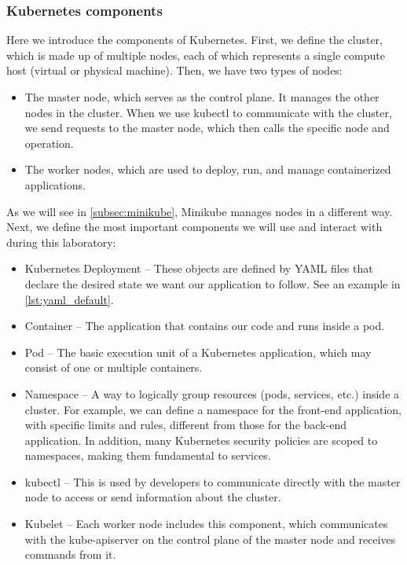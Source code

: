 \subsubsection{Kubernetes components}
\label{subsubsec:kubernetes components}
Here we introduce the components of Kubernetes. First, we define the cluster, which is made up of multiple nodes, each of which represents a single compute host (virtual or physical machine). Then, we have two types of nodes:

\begin{itemize}
    \item The master node, which serves as the control plane. It manages the other nodes in the cluster. When we use kubectl to communicate with the cluster, we send requests to the master node, which then calls the specific node and operation.
    \item The worker nodes, which are used to deploy, run, and manage containerized applications.
\end{itemize}
As we will see in \autoref{subsec:minikube}, Minikube manages nodes in a different way.
Next, we define the most important components we will use and interact with during this laboratory:

\begin{itemize}
    \item Kubernetes Deployment – These objects are defined by YAML files that declare the desired state we want our application to follow. See an example in \autoref{lst:yaml_default}.
    \item Container – The application that contains our code and runs inside a pod.
    \item Pod – The basic execution unit of a Kubernetes application, which may consist of one or multiple containers.
    \item Namespace – A way to logically group resources (pods, services, etc.) inside a cluster. For example, we can define a namespace for the front-end application, with specific limits and rules, different from those for the back-end application. In addition, many Kubernetes security policies are scoped to namespaces, making them fundamental to services.
    \item kubectl – This is used by developers to communicate directly with the master node to access or send information about the cluster.
    \item Kubelet – Each worker node includes this component, which communicates with the kube-apiserver on the control plane of the master node and receives commands from it.
\end{itemize}

